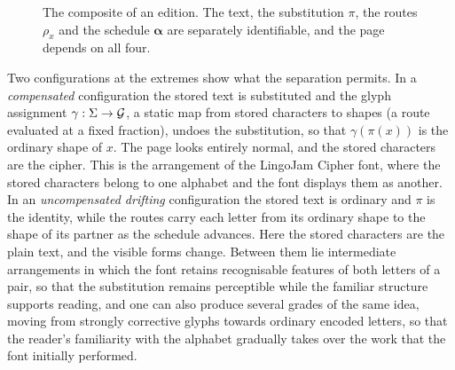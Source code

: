 \begin{figure}[ht]
\centering
{}
\caption{The composite of an edition. The text, the substitution $\pi$, the routes $\rho_x$ and the schedule $\boldsymbol\alpha$ are separately identifiable, and the page depends on all four.}\label{fig:pipeline}
\end{figure}

Two configurations at the extremes show what the separation permits. In a \emph{compensated} configuration the stored text is substituted and the glyph assignment $\gamma:\Sigma\to\mathcal{G}$, a static map from stored characters to shapes (a route evaluated at a fixed fraction), undoes the substitution, so that $\gamma(\pi(x))$ is the ordinary shape of $x$. The page looks entirely normal, and the stored characters are the cipher. This is the arrangement of the LingoJam Cipher font, where the stored characters belong to one alphabet and the font displays them as another. In an \emph{uncompensated drifting} configuration the stored text is ordinary and $\pi$ is the identity, while the routes carry each letter from its ordinary shape to the shape of its partner as the schedule advances. Here the stored characters are the plain text, and the visible forms change. Between them lie intermediate arrangements in which the font retains recognisable features of both letters of a pair, so that the substitution remains perceptible while the familiar structure supports reading, and one can also produce several grades of the same idea, moving from strongly corrective glyphs towards ordinary encoded letters, so that the reader's familiarity with the alphabet gradually takes over the work that the font initially performed.

